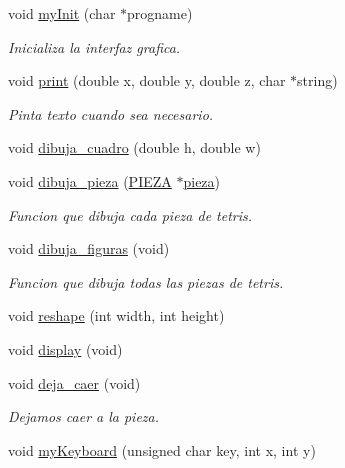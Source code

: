 \begin{DoxyCompactItemize}
\item 
void \hyperlink{interfaz-grafica_8c_a2db9d4ba828a33f3d95cb840b12aa58d}{my\+Init} (char $\ast$progname)
\begin{DoxyCompactList}\small\item\em Inicializa la interfaz grafica. \end{DoxyCompactList}\item 
void \hyperlink{interfaz-grafica_8c_aa50584771327fb90979684f968197158}{print} (double x, double y, double z, char $\ast$string)
\begin{DoxyCompactList}\small\item\em Pinta texto cuando sea necesario. \end{DoxyCompactList}\item 
void \hyperlink{interfaz-grafica_8c_aa120e3999a9d7ad9473f08f4b49e79c6}{dibuja\+\_\+cuadro} (double h, double w)
\item 
void \hyperlink{interfaz-grafica_8c_a5640fa261ed805f504d0bbffea24a1b7}{dibuja\+\_\+pieza} (\hyperlink{pieza_8h_aac4b603fd85c8ae53529fc00a88de8ae}{P\+I\+E\+ZA} $\ast$\hyperlink{structpieza}{pieza})
\begin{DoxyCompactList}\small\item\em Funcion que dibuja cada pieza de tetris. \end{DoxyCompactList}\item 
void \hyperlink{interfaz-grafica_8c_a5ba0624ca1f1a8027f803d6fe70f6838}{dibuja\+\_\+figuras} (void)
\begin{DoxyCompactList}\small\item\em Funcion que dibuja todas las piezas de tetris. \end{DoxyCompactList}\item 
void \hyperlink{interfaz-grafica_8c_a6819355374dd277347abd7c4235f0cd7}{reshape} (int width, int height)
\item 
void \hyperlink{interfaz-grafica_8c_a4ea013001a5fb47853d0fab8f8de35cd}{display} (void)
\item 
void \hyperlink{interfaz-grafica_8c_a0374c9d1b952aa94d93bb6cfd7ba0352}{deja\+\_\+caer} (void)
\begin{DoxyCompactList}\small\item\em Dejamos caer a la pieza. \end{DoxyCompactList}\item 
void \hyperlink{interfaz-grafica_8c_a723d4409337490d7963ce39bc9a6ec61}{my\+Keyboard} (unsigned char key, int x, int y)

\end{DoxyCompactItemize}
